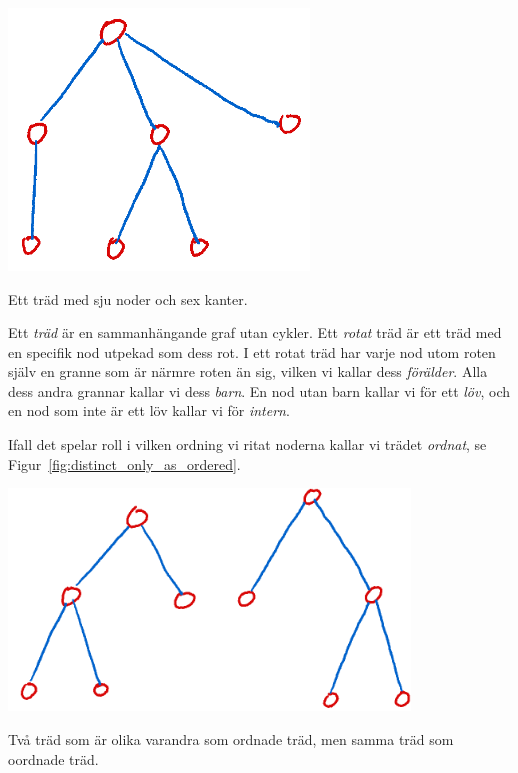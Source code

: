 \documentclass[nobib]{tufte-handout}
\begin{document}
\begin{definition}
    \begin{marginfigure}
        \centering
        \includegraphics[width=0.6\textwidth]{graphics/example_tree.png}
        \caption{Ett träd med sju noder och sex kanter.}
    \end{marginfigure}

    Ett \emph{träd} är en sammanhängande graf utan cykler. Ett \emph{rotat} träd är ett träd med en specifik nod utpekad som dess rot. I ett rotat träd har varje nod utom roten själv en granne som är närmre roten än sig, vilken vi kallar dess \emph{förälder}. Alla dess andra grannar kallar vi dess \emph{barn}. En nod utan barn kallar vi för ett \emph{löv}, och en nod som inte är ett löv kallar vi för \emph{intern}.

    Ifall det spelar roll i vilken ordning vi ritat noderna kallar vi trädet \emph{ordnat}, se Figur~\ref{fig:distinct_only_as_ordered}.

    \begin{marginfigure}
        \centering
        \includegraphics[width=0.8\textwidth]{graphics/ordered_versus_unordered_trees.png}
        \caption{Två träd som är olika varandra som ordnade träd, men samma träd som oordnade träd.}
        \label{fig:distinct_only_as_ordered}
    \end{marginfigure}
\end{definition}
\end{document}
